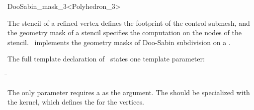 \ccRefPageEnd


\begin{ccRefClass}{DooSabin_mask_3<Polyhedron_3>}

\ccDefinition

The stencil of a refined vertex defines the footprint of the 
control submesh, and the geometry mask of a stencil specifies
the computation on the nodes of the stencil.
\ccClassTemplateName\ implements the geometry masks of 
Doo-Sabin subdivision on a .


\ccParameters

The full template declaration of \ccClassTemplateName\ states one
template parameter:

\begin{tabbing}
 \= 
\end{tabbing}
   
The only parameter requires a  as the argument. The
 should be specialized with the 
kernel, which defines the  for the vertices.

\ccCreation
{}


\ccThreeToTwo


\ccSeeAlso

\\

\end{ccRefClass}

